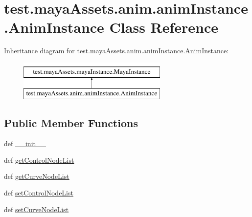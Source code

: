 \hypertarget{classtest_1_1mayaAssets_1_1anim_1_1animInstance_1_1AnimInstance}{\section{test.\-maya\-Assets.\-anim.\-anim\-Instance.\-Anim\-Instance \-Class \-Reference}
\label{da/dac/classtest_1_1mayaAssets_1_1anim_1_1animInstance_1_1AnimInstance}
}
\-Inheritance diagram for test.\-maya\-Assets.\-anim.\-anim\-Instance.\-Anim\-Instance\-:\begin{figure}[H]
\begin{center}
\leavevmode
\includegraphics[height=2.000000cm]{da/dac/classtest_1_1mayaAssets_1_1anim_1_1animInstance_1_1AnimInstance}
\end{center}
\end{figure}
\subsection*{\-Public \-Member \-Functions}
\begin{DoxyCompactItemize}
\item 
def \hyperlink{classtest_1_1mayaAssets_1_1anim_1_1animInstance_1_1AnimInstance_a149b74334d77d25ed0fd5d37bbcaa5eb}{\-\_\-\-\_\-init\-\_\-\-\_\-}
\item 
def \hyperlink{classtest_1_1mayaAssets_1_1anim_1_1animInstance_1_1AnimInstance_a22bfe443ecf73113e234e8642ef8d5d9}{get\-Control\-Node\-List}
\item 
def \hyperlink{classtest_1_1mayaAssets_1_1anim_1_1animInstance_1_1AnimInstance_af7f89824da403f6ea444b7ebdec2ecad}{get\-Curve\-Node\-List}
\item 
def \hyperlink{classtest_1_1mayaAssets_1_1anim_1_1animInstance_1_1AnimInstance_ac7ced042e87f026609cc65f60f92ec22}{set\-Control\-Node\-List}
\item 
def \hyperlink{classtest_1_1mayaAssets_1_1anim_1_1animInstance_1_1AnimInstance_a97fc1c1b75bf3ef5066d8dbaee94ed57}{set\-Curve\-Node\-List}
\end{DoxyCompactItemize}


